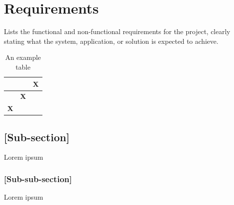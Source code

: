 \chapter{Requirements} 
Lists the functional and non-functional requirements for the project, clearly stating what the system, application, or solution is expected to achieve. 

\begin{table}[H] 
\centering 
\caption{An example table} 
\label{tab:example} 

\begin{tabular}{|c|c|c|} 
\hline 
& & \textbf{X} \\ 
\hline 
& \textbf{X} & \\ 
\hline 
\textbf{X} & & \\ 
\hline \end{tabular} 
\end{table} 

\section{[Sub-section]} Lorem ipsum 

\subsection{[Sub-sub-section]} Lorem ipsum